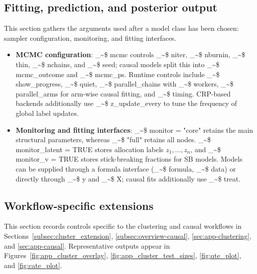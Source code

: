 \documentclass[preprint,12pt,authoryear]{elsarticle}
\makeatletter
\newcommand\code{\bgroup\@makeother\_\@makeother\~\@makeother\$\@codex}
\def\@codex#1{{\normalfont\ttfamily\hyphenchar\font=-1 #1}\egroup}
\makeatother
\begin{document}
\subsection{Fitting, prediction, and posterior output}
\label{subsec:app-fitting}

This section gathers the arguments used after a model class has been chosen: sampler configuration, monitoring, and fitting interfaces.

\begin{itemize}
\item \textbf{MCMC configuration}: \code{mcmc} controls \code{niter}, \code{nburnin}, \code{thin}, \code{nchains}, and \code{seed}; causal models split this into \code{mcmc\_outcome} and \code{mcmc\_ps}. Runtime controls include \code{show\_progress}, \code{quiet}, \code{parallel\_chains} with \code{workers}, \code{parallel\_arms} for arm-wise causal fitting, and \code{timing}. CRP-based backends additionally use \code{z\_update\_every} to tune the frequency of global label updates.
\item \textbf{Monitoring and fitting interfaces}: \code{monitor = "core"} retains the main structural parameters, whereas \code{"full"} retains all nodes. \code{monitor\_latent = TRUE} stores allocation labels $z_1,\ldots,z_n$, and \code{monitor\_v = TRUE} stores stick-breaking fractions for SB models. Models can be supplied through a formula interface (\code{formula}, \code{data}) or directly through \code{y} and \code{X}; causal fits additionally use \code{treat}.

\end{itemize}

\subsection{Workflow-specific extensions}
\label{subsec:app-workflows}

This section records controls specific to the clustering and causal workflows in Sections~\ref{subsec:cluster_extension}, \ref{subsec:overview-causal}, \ref{sec:app-clustering}, and \ref{sec:app-causal}. Representative outputs appear in Figures~\ref{fig:app_cluster_overlay}, \ref{fig:app_cluster_test_sizes}, \ref{fig:qte_plot}, and \ref{fig:cate_plot}.
\end{document}

